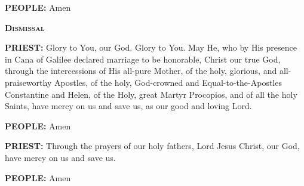 \textbf{PEOPLE:} Amen

\textbf{\textsc{Dismissal}}

\textbf{PRIEST:} Glory to You, our God. Glory to You. May He, who by His
presence in Cana of Galilee declared marriage to be honorable, Christ
our true God, through the intercessions of His all-pure Mother, of the
holy, glorious, and all-praiseworthy Apostles, of the holy, God-crowned
and Equal-to-the-Apostles Constantine and Helen, of the Holy, great
Martyr Procopios, and of all the holy Saints, have mercy on us and save
us, as our good and loving Lord.

\textbf{PEOPLE:} Amen

\textbf{PRIEST:} Through the prayers of our holy fathers, Lord Jesus
Christ, our God, have mercy on us and save us.

\textbf{PEOPLE:} Amen
